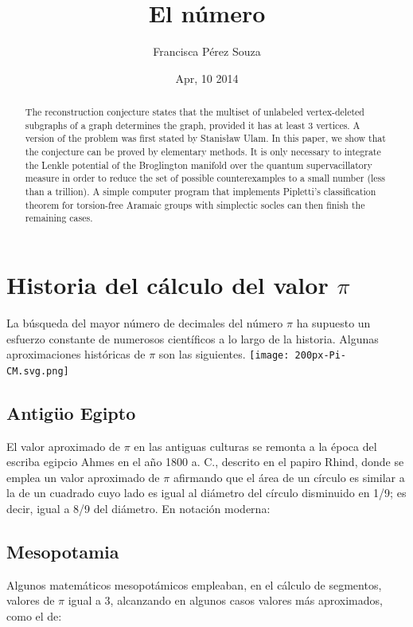 \documentclass[spanish,a4paper,11pt]{article}
\title{El número \pi}
\author{Francisca Pérez Souza}
\date{Apr, 10 2014}
\newcommand{\PI}{{$\pi$ }}
\begin{document}
\maketitle

\begin{abstract}
The reconstruction conjecture states that the multiset of unlabeled
vertex-deleted subgraphs of a graph determines the graph, provided it
has at least 3 vertices. A version of the problem was first stated
by Stanis\l aw Ulam. In this paper, we show that the conjecture can
be proved by elementary methods. It is only necessary to integrate
the Lenkle potential of the Broglington manifold over the quantum
supervacillatory measure in order to reduce the set of possible
counterexamples to a small number (less than a trillion). A simple
computer program that implements Pipletti's classification theorem
for torsion-free Aramaic groups with simplectic socles can then
finish the remaining cases.
\end{abstract}

\section{Historia del cálculo del valor \PI}
La búsqueda del mayor número de decimales del número \PI ha supuesto un esfuerzo constante
de numerosos científicos a lo largo de la historia. Algunas aproximaciones históricas de \PI son las siguientes.
\texttt{[image: 200px-Pi-CM.svg.png]}

\subsection{Antigüo Egipto}
El valor aproximado de \PI en las antiguas culturas se remonta a la época del escriba egipcio Ahmes en el año 1800 a. C.,
descrito en el papiro Rhind\cite{Robins}, donde se emplea un valor aproximado de \PI afirmando que el área de un círculo
es similar a la de un cuadrado cuyo lado es igual al diámetro del círculo disminuido en 1/9; es decir, igual a 8/9 del
diámetro. En notación moderna:

\subsection{Mesopotamia}
Algunos matemáticos mesopotámicos empleaban, en el cálculo de segmentos, valores de \PI igual a 3, alcanzando en algunos
casos valores más aproximados, como el de:
\end{document}
